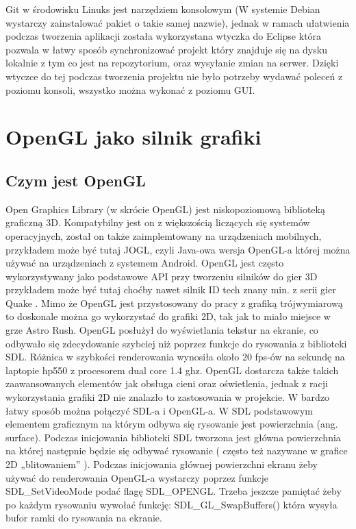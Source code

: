 Git w środowisku Linuks jest narzędziem konsolowym (W systemie Debian wystarczy zainstalować pakiet o takie samej nazwie), jednak w ramach ułatwienia podczas tworzenia aplikacji została wykorzystana wtyczka do Eclipse która pozwala w łatwy sposób synchronizować projekt który znajduje się na dysku lokalnie z tym co jest na repozytorium, oraz wysyłanie zmian na serwer. Dzięki wtyczce do tej podczas tworzenia projektu nie było potrzeby wydawać poleceń z poziomu konsoli, wszystko można wykonać z poziomu GUI.


\section{OpenGL jako silnik grafiki}

\subsection{Czym jest OpenGL}
Open Graphics Library (w skrócie OpenGL) jest niskopoziomową biblioteką  graficzną 3D. Kompatybilny jest on z większością liczących się systemów
operacyjnych, został on także zaimplemtowany na urządzeniach mobilnych, przykładem może być tutaj JOGL, czyli Java-owa wersja OpenGL-a której można
używać na urządzeniach z systemem Android. OpenGL jest często wykorzystywany jako podstawowe API przy tworzeniu silników do gier 3D przykładem może
być tutaj choćby nawet silnik ID tech znany min. z serii gier Quake . Mimo że OpenGL jest przystosowany do pracy z grafiką trójwymiarową to doskonale
można go wykorzystać do grafiki 2D, tak jak to miało miejsce w grze Astro Rush. OpenGL posłużył do wyświetlania tekstur na ekranie, co odbywało się
zdecydowanie szybciej niż poprzez funkcje do rysowania z biblioteki SDL.  Różnica w szybkości renderowania wynosiła około 20 fps-ów na sekundę na
laptopie hp550 z procesorem dual core 1.4 ghz. OpenGL dostarcza także takich zaawansowanych elementów jak obsługa cieni oraz oświetlenia, jednak z
racji wykorzystania grafiki 2D nie znalazło to zastosowania w projekcie.
	W bardzo łatwy sposób można połączyć SDL-a i OpenGL-a.
W SDL podstawowym elementem graficznym na którym odbywa się rysowanie jest powierzchnia (ang. surface). Podczas inicjowania biblioteki SDL tworzona
jest główna powierzchnia na której następnie będzie się odbywać rysowanie ( często też nazywane w grafice 2D „blitowaniem” ). Podczas inicjowania
głównej powierzchni ekranu żeby używać do renderowania OpenGL-a wystarczy poprzez funkcje SDL\_SetVideoMode podać flagę SDL\_OPENGL. Trzeba jeszcze
pamiętać żeby po każdym rysowaniu wywołać funkcję: SDL\_GL\_SwapBuffers() która wysyła bufor ramki do rysowania na ekranie.


